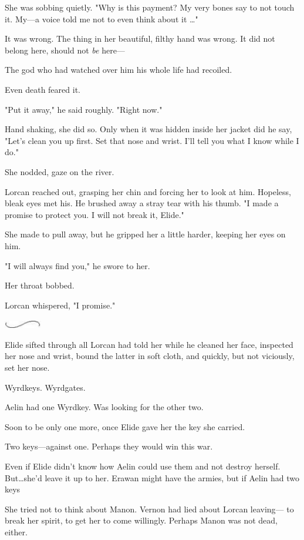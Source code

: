 She was sobbing quietly.
"Why is this payment?
My very bones say to not touch it.
My---a voice told me not to even think about it \ldots"

It was wrong.
The thing in her beautiful, filthy hand was wrong.
It did not belong here, should not \emph{be} here---

The god who had watched over him his whole life had recoiled.

Even death feared it.

"Put it away," he said roughly.
"Right now."

Hand shaking, she did so.
Only when it was hidden inside her jacket did he say, "Let's clean you up first.
Set that nose and wrist.
I'll tell you what I know while I do."

She nodded, gaze on the river.

Lorcan reached out, grasping her chin and forcing her to look at him.
Hopeless, bleak eyes met his.
He brushed away a stray tear with his thumb.
"I made a promise to protect you.
I will not break it, Elide."

She made to pull away, but he gripped her a little harder, keeping her eyes on him.

"I will always find you," he swore to her.

Her throat bobbed.

Lorcan whispered, "I promise."

\begin{center}
	\includegraphics[width=0.65in,height=0.13in]{images/seperator}
\end{center}

Elide sifted through all Lorcan had told her while he cleaned her face, inspected her nose and wrist, bound the latter in soft cloth, and quickly, but not viciously, set her nose.

Wyrdkeys.
Wyrdgates.

Aelin had one Wyrdkey.
Was looking for the other two.

Soon to be only one more, once Elide gave her the key she carried.

Two keys---against one.
Perhaps they would win this war.

Even if Elide didn't know how Aelin could use them and not destroy herself.
But\ldots she'd leave it up to her.
Erawan might have the armies, but if Aelin had two keys 

She tried not to think about Manon.
Vernon had lied about Lorcan leaving--- to break her spirit, to get her to come willingly.
Perhaps Manon was not dead, either.

